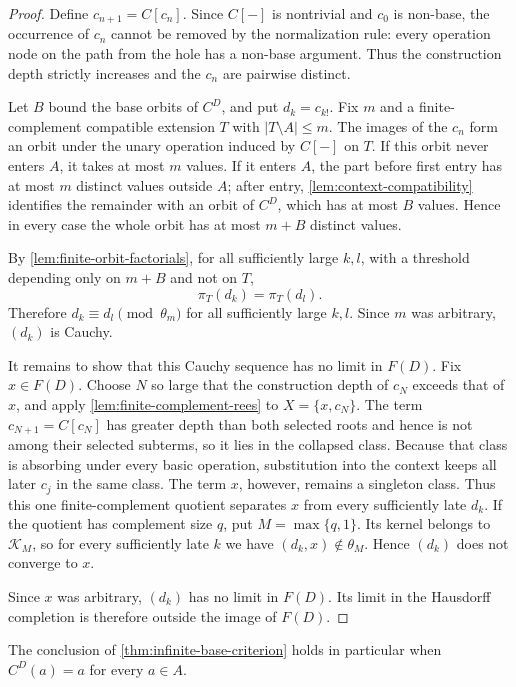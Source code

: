 \begin{proof}
Define $c_{n+1}=C[c_n]$.  Since $C[-]$ is nontrivial and $c_0$ is non-base,
the occurrence of $c_n$ cannot be removed by the normalization rule: every
operation node on the path from the hole has a non-base argument.  Thus the
construction depth strictly increases and the $c_n$ are pairwise distinct.

Let $B$ bound the base orbits of $C^D$, and put $d_k=c_{k!}$.  Fix $m$ and a
finite-complement compatible extension $T$ with $|T\setminus A|\le m$.  The
images of the $c_n$ form an orbit under the unary operation induced by $C[-]$
on $T$.  If this orbit never enters $A$, it takes at most $m$ values.  If it
enters $A$, the part before first entry has at most $m$ distinct values outside
$A$; after entry, \cref{lem:context-compatibility} identifies the remainder
with an orbit of $C^D$, which has at most $B$ values.  Hence in every case the
whole orbit has at most $m+B$ distinct values.

By \cref{lem:finite-orbit-factorials}, for all sufficiently large $k,l$, with
a threshold depending only on $m+B$ and not on $T$,
\[
 \pi_T(d_k)=\pi_T(d_l).
\]
Therefore $d_k\equiv d_l\pmod{\theta_m}$ for all sufficiently large $k,l$.
Since $m$ was arbitrary, $(d_k)$ is Cauchy.

It remains to show that this Cauchy sequence has no limit in $F(D)$.  Fix
$x\in F(D)$.  Choose $N$ so large that the construction depth of $c_N$ exceeds
that of $x$, and apply \cref{lem:finite-complement-rees} to
$X=\{x,c_N\}$.  The term $c_{N+1}=C[c_N]$ has greater depth than both selected
roots and hence is not among their selected subterms, so it lies in the
collapsed class.  Because that class is absorbing under every basic operation,
substitution into the context keeps all later $c_j$ in the same class.  The
term $x$, however, remains a singleton class.  Thus this one
finite-complement quotient separates $x$ from every sufficiently late $d_k$.
If the quotient has complement size $q$, put $M=\max\{q,1\}$.  Its kernel
belongs to $\mathcal K_M$, so for every sufficiently late $k$ we have
$(d_k,x)\notin\theta_M$.  Hence $(d_k)$ does not converge to $x$.

Since $x$ was arbitrary, $(d_k)$ has no limit in $F(D)$.  Its limit in the
Hausdorff completion is therefore outside the image of $F(D)$.
\end{proof}

\begin{corollary}\label{cor:base-fixing}
The conclusion of \cref{thm:infinite-base-criterion} holds in particular when
$C^D(a)=a$ for every $a\in A$.
\end{corollary}


